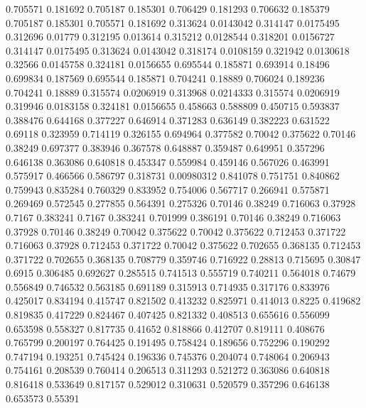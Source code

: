 0.705571 0.181692
0.705187 0.185301
0.706429 0.181293
0.706632 0.185379
0.705187 0.185301
0.705571 0.181692
0.313624 0.0143042
0.314147 0.0175495
0.312696 0.01779
0.312195 0.013614
0.315212 0.0128544
0.318201 0.0156727
0.314147 0.0175495
0.313624 0.0143042
0.318174 0.0108159
0.321942 0.0130618
0.32566 0.0145758
0.324181 0.0156655
0.695544 0.185871
0.693914 0.18496
0.699834 0.187569
0.695544 0.185871
0.704241 0.18889
0.706024 0.189236
0.704241 0.18889
0.315574 0.0206919
0.313968 0.0214333
0.315574 0.0206919
0.319946 0.0183158
0.324181 0.0156655
0.458663 0.588809
0.450715 0.593837
0.388476 0.644168
0.377227 0.646914
0.371283 0.636149
0.382223 0.631522
0.69118 0.323959
0.714119 0.326155
0.694964 0.377582
0.70042 0.375622
0.70146 0.38249
0.697377 0.383946
0.367578 0.648887
0.359487 0.649951
0.357296 0.646138
0.363086 0.640818
0.453347 0.559984
0.459146 0.567026
0.463991 0.575917
0.466566 0.586797
0.318731 0.00980312
0.841078 0.751751
0.840862 0.759943
0.835284 0.760329
0.833952 0.754006
0.567717 0.266941
0.575871 0.269469
0.572545 0.277855
0.564391 0.275326
0.70146 0.38249
0.716063 0.37928
0.7167 0.383241
0.7167 0.383241
0.701999 0.386191
0.70146 0.38249
0.716063 0.37928
0.70146 0.38249
0.70042 0.375622
0.70042 0.375622
0.712453 0.371722
0.716063 0.37928
0.712453 0.371722
0.70042 0.375622
0.702655 0.368135
0.712453 0.371722
0.702655 0.368135
0.708779 0.359746
0.716922 0.28813
0.715695 0.30847
0.6915 0.306485
0.692627 0.285515
0.741513 0.555719
0.740211 0.564018
0.74679 0.556849
0.746532 0.563185
0.691189 0.315913
0.714935 0.317176
0.833976 0.425017
0.834194 0.415747
0.821502 0.413232
0.825971 0.414013
0.8225 0.419682
0.819835 0.417229
0.824467 0.407425
0.821332 0.408513
0.655616 0.556099
0.653598 0.558327
0.817735 0.41652
0.818866 0.412707
0.819111 0.408676
0.765799 0.200197
0.764425 0.191495
0.758424 0.189656
0.752296 0.190292
0.747194 0.193251
0.745424 0.196336
0.745376 0.204074
0.748064 0.206943
0.754161 0.208539
0.760414 0.206513
0.311293 0.521272
0.363086 0.640818
0.816418 0.533649
0.817157 0.529012
0.310631 0.520579
0.357296 0.646138
0.653573 0.55391
